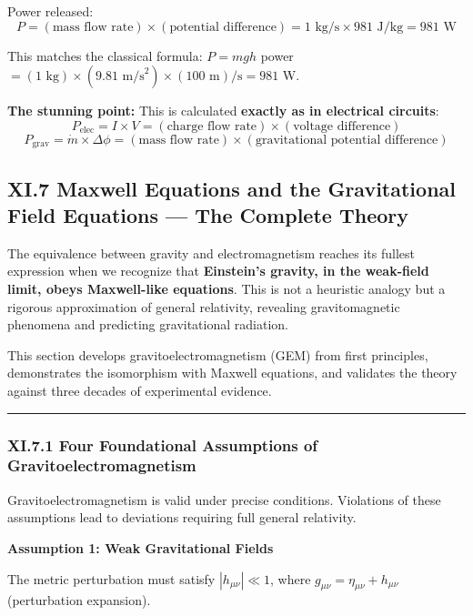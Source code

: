 \documentclass[
]{article}
\begin{document}
Power released:
\[P = (\text{mass flow rate}) \times (\text{potential difference}) = 1 \text{ kg/s} \times 981 \text{ J/kg} = 981 \text{ W}\]

This matches the classical formula: \(P = mgh\) power
\(= (1 \text{ kg}) \times (9.81 \text{ m/s}^2) \times (100 \text{ m})/\text{s} = 981\)
W.

\textbf{The stunning point:} This is calculated \textbf{exactly as in
electrical circuits}:
\[P_{\text{elec}} = I \times V = (\text{charge flow rate}) \times (\text{voltage difference})\]
\[P_{\text{grav}} = \dot{m} \times \Delta\phi = (\text{mass flow rate}) \times (\text{gravitational potential difference})\]

\subsection{XI.7 Maxwell Equations and the Gravitational Field Equations
--- The Complete
Theory}\label{xi.7-maxwell-equations-and-the-gravitational-field-equations-the-complete-theory}

The equivalence between gravity and electromagnetism reaches its fullest
expression when we recognize that \textbf{Einstein's gravity, in the
weak-field limit, obeys Maxwell-like equations}. This is not a heuristic
analogy but a rigorous approximation of general relativity, revealing
gravitomagnetic phenomena and predicting gravitational radiation.

This section develops gravitoelectromagnetism (GEM) from first
principles, demonstrates the isomorphism with Maxwell equations, and
validates the theory against three decades of experimental evidence.

\begin{center}\rule{0.5\linewidth}{0.5pt}\end{center}

\subsubsection{XI.7.1 Four Foundational Assumptions of
Gravitoelectromagnetism}\label{xi.7.1-four-foundational-assumptions-of-gravitoelectromagnetism}

Gravitoelectromagnetism is valid under precise conditions. Violations of
these assumptions lead to deviations requiring full general relativity.

\textbf{Assumption 1: Weak Gravitational Fields}

The metric perturbation must satisfy \(|h_{\mu\nu}| \ll 1\), where
\(g_{\mu\nu} = \eta_{\mu\nu} + h_{\mu\nu}\) (perturbation expansion).
\end{document}
